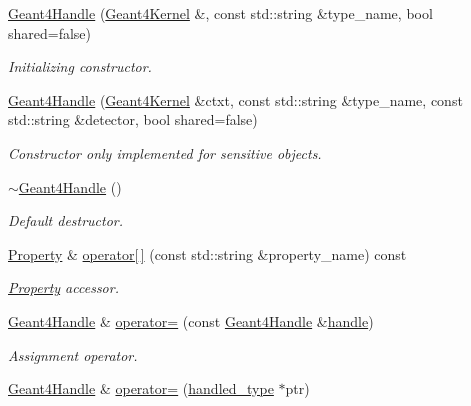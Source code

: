 \begin{DoxyCompactItemize}
\hyperlink{class_d_d4hep_1_1_simulation_1_1_geant4_handle_ae506e6b636fc035905011c9e5a9012ab}{Geant4\+Handle} (\hyperlink{class_d_d4hep_1_1_simulation_1_1_geant4_kernel}{Geant4\+Kernel} \&, const std\+::string \&type\+\_\+name, bool shared=false)
\begin{DoxyCompactList}\small\item\em Initializing constructor. \end{DoxyCompactList}\item 
\hyperlink{class_d_d4hep_1_1_simulation_1_1_geant4_handle_a8a80a9a11de03a890561185f4e45ba18}{Geant4\+Handle} (\hyperlink{class_d_d4hep_1_1_simulation_1_1_geant4_kernel}{Geant4\+Kernel} \&ctxt, const std\+::string \&type\+\_\+name, const std\+::string \&detector, bool shared=false)
\begin{DoxyCompactList}\small\item\em Constructor only implemented for sensitive objects. \end{DoxyCompactList}\item 
\hyperlink{class_d_d4hep_1_1_simulation_1_1_geant4_handle_adfcf2edb6e30d0780f2a20a8be6f47b5}{$\sim$\+Geant4\+Handle} ()
\begin{DoxyCompactList}\small\item\em Default destructor. \end{DoxyCompactList}\item 
\hyperlink{class_d_d4hep_1_1_property}{Property} \& \hyperlink{class_d_d4hep_1_1_simulation_1_1_geant4_handle_ab844fdd7f6360704163c3ebf3381f651}{operator\mbox{[}$\,$\mbox{]}} (const std\+::string \&property\+\_\+name) const
\begin{DoxyCompactList}\small\item\em \hyperlink{class_d_d4hep_1_1_property}{Property} accessor. \end{DoxyCompactList}\item 
\hyperlink{class_d_d4hep_1_1_simulation_1_1_geant4_handle}{Geant4\+Handle} \& \hyperlink{class_d_d4hep_1_1_simulation_1_1_geant4_handle_a92e5bb66d347989002bc13a328502e04}{operator=} (const \hyperlink{class_d_d4hep_1_1_simulation_1_1_geant4_handle}{Geant4\+Handle} \&\hyperlink{_geant4_converter_8cpp_a3789cd8800e1433fb917a1d6f85ef67d}{handle})
\begin{DoxyCompactList}\small\item\em Assignment operator. \end{DoxyCompactList}\item 
\hyperlink{class_d_d4hep_1_1_simulation_1_1_geant4_handle}{Geant4\+Handle} \& \hyperlink{class_d_d4hep_1_1_simulation_1_1_geant4_handle_ab249ffa125a4a3460135843a2fd83a75}{operator=} (\hyperlink{class_d_d4hep_1_1_simulation_1_1_geant4_handle_a35e583b9228e38c95d23112ad19b645d}{handled\+\_\+type} $\ast$ptr)

\end{DoxyCompactItemize}
